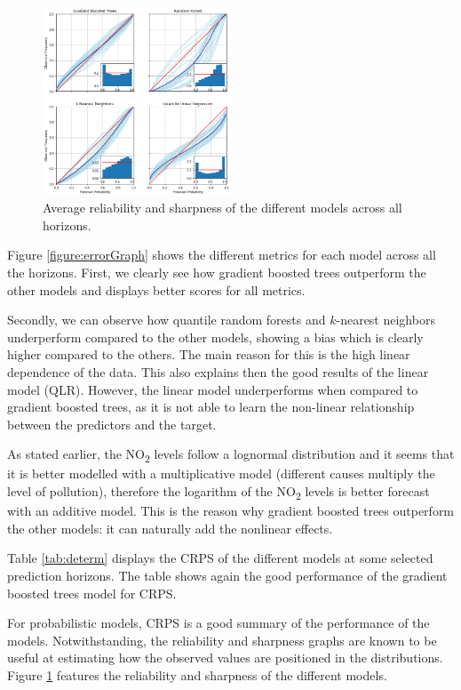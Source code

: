 \documentclass[a4paper,twocolumn,5p]{elsarticle}
\begin{document}
\begin{figure}
  \centering
  \includegraphics[width=0.5\textwidth]{reliability_sharpness}
  \caption{\label{figure:rel_sharp}Average reliability and sharpness
    of the different models across all horizons.}
\end{figure}

Figure \ref{figure:errorGraph} shows the different metrics for each
model across all the horizons. First, we clearly see how gradient
boosted trees outperform the other models and displays better scores
for all metrics.

Secondly, we can observe how quantile random forests and $k$-nearest
neighbors underperform compared to the other models, showing a bias
which is clearly higher compared to the others.  The main reason for
this is the high linear dependence of the data. This also explains
then the good results of the linear model (QLR).  However, the linear
model underperforms when compared to gradient boosted trees, as it is
not able to learn the non-linear relationship between the predictors
and the target.

As stated earlier, the NO\textsubscript{2} levels follow a lognormal
distribution and it seems that it is better modelled with a
multiplicative model (different causes multiply the level of
pollution), therefore the logarithm of the NO\textsubscript{2} levels
is better forecast with an additive model. This is the reason why
gradient boosted trees outperform the other models: it can naturally
add the nonlinear effects.

Table \ref{tab:determ} displays the CRPS of the different models at
some selected prediction horizons. The table shows again the good
performance of the gradient boosted trees model for CRPS.

For probabilistic models, CRPS is a good summary of the performance of
the models. Notwithstanding, the reliability and sharpness graphs are
known to be useful at estimating how the observed values are
positioned in the distributions.  Figure \ref{figure:rel_sharp}
features the reliability and sharpness of the different models.
\end{document}
